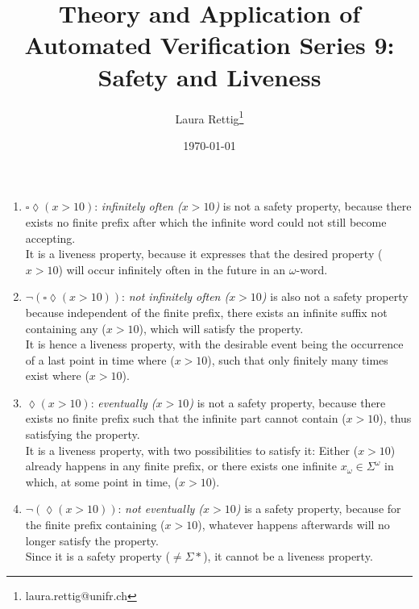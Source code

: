 \documentclass[11pt,a4paper]{article}
\title{
        Theory and Application of Automated Verification \linebreak
        \bf{Series 9: Safety and Liveness}
}
\author{
        Laura Rettig\footnote{laura.rettig@unifr.ch}
       }
\date{\normalsize \today}
\begin{document}

\maketitle

\begin{enumerate}
\item $\square\lozenge (x>10)$: \emph{infinitely often ($x>10$)} is not a safety property, because there exists no finite prefix after which the infinite word could not still become accepting. \\ It is a liveness property, because it expresses that the desired property ($x>10$) will occur infinitely often in the future in an $\omega$-word.
\item $\lnot(\square\lozenge (x>10))$: \emph{not infinitely often ($x>10$)} is also not a safety property because independent of the finite prefix, there exists an infinite suffix not containing any ($x>10$), which will satisfy the property. \\ It is hence a liveness property, with the desirable event being the occurrence of a last point in time where ($x>10$), such that only finitely many times exist where ($x>10$).
\item $\lozenge(x>10)$: \emph{eventually ($x>10$)} is not a safety property, because there exists no finite prefix such that the infinite part cannot contain ($x>10$), thus satisfying the property. \\ It is a liveness property, with two possibilities to satisfy it: Either ($x>10$) already happens in any finite prefix, or there exists one infinite $x_\omega \in \Sigma^\omega$ in which, at some point in time,  ($x>10$).
\item $\lnot(\lozenge (x>10))$: \emph{not eventually ($x>10$)} is a safety property, because for the finite prefix containing ($x>10$), whatever happens afterwards will no longer satisfy the property. \\ Since it is a safety property ($\neq \Sigma*$), it cannot be a liveness property.
\end{enumerate}


\end{document}
